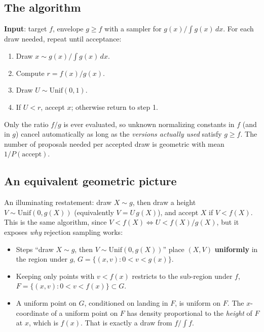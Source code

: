 \documentclass[
  letterpaper,
  DIV=11,
  numbers=noendperiod]{scrreprt}
\providecommand{\tightlist}{%
  \setlength{\itemsep}{0pt}\setlength{\parskip}{0pt}}
\begin{document}
\subsection{The algorithm}\label{the-algorithm-1}

\textbf{Input}: target \(f\), envelope \(g \ge f\) with a sampler for
\(g(x)/\!\int g(x)\,dx\). For each draw needed, repeat until acceptance:

\begin{enumerate}
\def\labelenumi{\arabic{enumi}.}
\tightlist
\item
  Draw \(x \sim g(x)/\!\int g(x)\,dx\).
\item
  Compute \(r = f(x)/g(x)\).
\item
  Draw \(U \sim \text{Unif}(0,1)\).
\item
  If \(U < r\), accept \(x\); otherwise return to step 1.
\end{enumerate}

Only the ratio \(f/g\) is ever evaluated, so unknown normalizing
constants in \(f\) (and in \(g\)) cancel automatically as long as the
\emph{versions actually used} satisfy \(g \ge f\). The number of
proposals needed per accepted draw is geometric with mean
\(1/P(\text{accept})\).

\subsection{An equivalent geometric
picture}\label{an-equivalent-geometric-picture}

An illuminating restatement: draw \(X \sim g\), then draw a height
\(V \sim \text{Unif}(0, g(X))\) (equivalently \(V = U\,g(X)\)), and
accept \(X\) if \(V < f(X)\). This is the same algorithm, since
\(V < f(X) \iff U < f(X)/g(X)\), but it exposes \emph{why} rejection
sampling works:

\begin{itemize}
\tightlist
\item
  Steps ``draw \(X\sim g\), then \(V\sim\text{Unif}(0,g(X))\)'' place
  \((X,V)\) \textbf{uniformly} in the region under \(g\),
  \(G = \{(x,v): 0<v<g(x)\}\).
\item
  Keeping only points with \(v < f(x)\) restricts to the sub-region
  under \(f\), \(F = \{(x,v): 0<v<f(x)\} \subset G\).
\item
  A uniform point on \(G\), conditioned on landing in \(F\), is uniform
  on \(F\). The \(x\)-coordinate of a uniform point on \(F\) has density
  proportional to the \emph{height} of \(F\) at \(x\), which is
  \(f(x)\). That is exactly a draw from \(f/\!\int f\).
\end{itemize}
\end{document}

